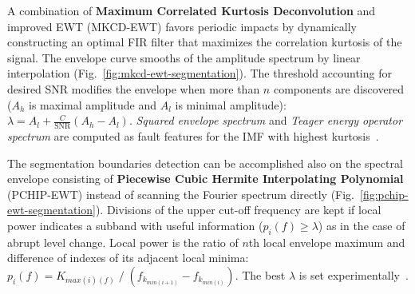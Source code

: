 A combination of \textbf{Maximum Correlated Kurtosis Deconvolution} and improved EWT (MKCD-EWT) favors periodic impacts by dynamically constructing an optimal FIR filter that maximizes the correlation kurtosis of the signal. The envelope curve smooths of the amplitude spectrum by linear interpolation (Fig.~\ref{fig:mkcd-ewt-segmentation}). The threshold accounting for desired SNR modifies the envelope when more than $n$ components are discovered ($A_h$ is maximal amplitude and $A_l$ is minimal amplitude): $\lambda = A_l + \frac{C}{\mathrm{SNR}}(A_h - A_l)$. \emph{Squared envelope spectrum} and \emph{Teager energy operator spectrum} are computed as fault features for the IMF with highest kurtosis~\cite{li_fault_2019}. 

The segmentation boundaries detection can be accomplished also on the spectral envelope consisting of \textbf{Piecewise Cubic Hermite Interpolating Polynomial} (PCHIP-EWT) instead of scanning the Fourier spectrum directly (Fig.~\ref{fig:pchip-ewt-segmentation}). Divisions of the upper cut-off frequency are kept if local power indicates a subband with useful information ($p_i(f) \geq \lambda$)  as in the case of abrupt level change. Local power is the ratio of $n$th local envelope maximum and difference of indexes of its adjacent local minima:  $p_i(f) = K_{max(i)(f)} \;/\;\left(f_{k_{min(i+1)}} - f_{k_{min(i)}}\right)$. The best $\lambda$ is set experimentally~\cite{zhuang_improved_2020}.

